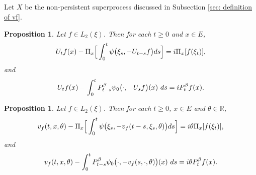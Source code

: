 \documentclass[12pt,oneside,english]{amsart}
\theoremstyle{plain}
\newtheorem{prop}[thm]{Proposition}
\theoremstyle{definition}
\numberwithin{equation}{section}
\newcommand{\added}[1]{{\color{blue}#1}}\newcommand{\deleted}[1]{{\color{red}#1}}
\begin{document}
\subsection{}
    Let $X$ be the non-persistent superprocess discussed in Subsection \ref{sec: definition of vf}.
\added{
\begin{prop}
\label{prop: complex FKPP-equation}
    Let $f\in L_2(\xi)$. Then for each $t\geq 0$ and $x\in E$,
\begin{equation}
\label{eq: complex FKPP-equation}
    U_tf(x) - \Pi_x \Big[\int_0^t \psi\big(\xi_s, - U_{t-s}f\big) ds \Big]
    \\= i \Pi_x [f(\xi_t)],
\end{equation}
and
\begin{equation}
\label{eq: complex FKPP-equation with FK-transform}
    U_tf(x) -  \int_0^t P_{t-s}^{\beta} \psi_0\big(\cdot,-U_sf\big) (x)~ds
    \\= iP_t^\beta f(x).
\end{equation}
\end{prop}
}
\deleted{
\begin{prop}
    Let $f\in L_2(\xi)$. Then for each $t\geq 0$, $x\in E$ and $\theta \in \mathbb R$,
\begin{equation}
    v_f(t,x,\theta) - \Pi_{x} \Big[\int_0^t \psi\big(\xi_s, - v_f(t-s,\xi_s,\theta)\big) ds \Big]
    \\= i\theta \Pi_{x} [f(\xi_t)],
\end{equation}
    and
\begin{equation}
    v_f(t,x,\theta) -  \int_0^t P_{t-s}^{\beta} \psi_0\big(\cdot,-v_f(s,\cdot,\theta)\big) (x)~ds
    \\= i\theta P_t^\beta f(x).
\end{equation}
\end{prop}
}
\end{document}
